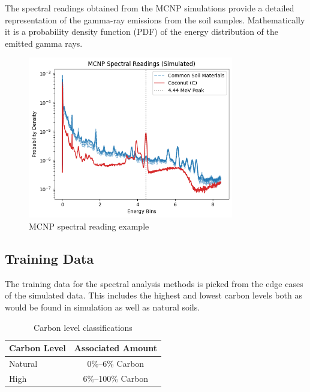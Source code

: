 \documentclass[review]{elsarticle}
\begin{document}
The spectral readings obtained from the MCNP simulations provide a detailed representation of the gamma-ray emissions from the soil samples. Mathematically it is a probability density function (PDF) of the energy distribution of the emitted gamma rays.

\begin{figure}[H]
\centering
\includegraphics[width=0.8\textwidth]{../Figures/DataGeneration/MCNPSpectralReading.png}
\caption{MCNP spectral reading example}
\label{fig:mcnp_spectral}
\end{figure}

\subsection{Training Data}

The training data for the spectral analysis methods is picked from the edge cases of the simulated data. This includes the highest and lowest carbon levels both as would be found in simulation as well as natural soils.

\begin{table}[H]
\centering
\caption{Carbon level classifications}
\label{tab:carbon_levels}
\begin{tabular}{@{}lc@{}}
\toprule
Carbon Level & Associated Amount \\
\midrule
Natural & 0\%--6\% Carbon \\
High & 6\%--100\% Carbon \\
\bottomrule
\end{tabular}
\end{table}
\end{document}
